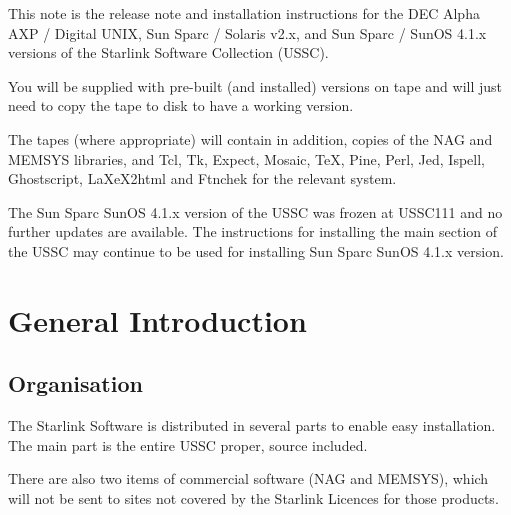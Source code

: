 
This note is the release note and installation instructions for the
DEC Alpha AXP / Digital UNIX, Sun Sparc / Solaris v2.x, and Sun Sparc / 
SunOS 4.1.x versions of the Starlink Software Collection (USSC).

You will be supplied with pre-built (and installed) versions on tape
and will just need to copy the tape to disk to have a working version.

The tapes (where appropriate) will contain in addition, copies of the
NAG and MEMSYS libraries, and Tcl, Tk, Expect, Mosaic, TeX, Pine, Perl,
Jed, Ispell, Ghostscript, LaXeX2html and Ftnchek for the relevant system.

The Sun Sparc SunOS 4.1.x version of the USSC was frozen at USSC111 and
no further updates are available.  The instructions for installing the
main section of the USSC may continue to be used for installing Sun
Sparc SunOS 4.1.x version.

 
 \newpage
 \begin{latexonly}
   \setlength{\parskip}{0mm}
   \latexonlytoc
   \setlength{\parskip}{\medskipamount}
   \markright{\stardocname}
 \end{latexonly}
\newpage
\renewcommand{\thepage}{\arabic{page}}
 \setcounter{page}{1}

\section{General Introduction} 
\label{s:intro}

\subsection{Organisation}
\label{s:intro:organ}

The Starlink Software is distributed in several parts to enable easy 
installation.  The main part is the entire USSC proper, source included. 

There are also two items of commercial software (NAG and MEMSYS), which 
will not be sent to sites not covered by the Starlink Licences for those
products.  

